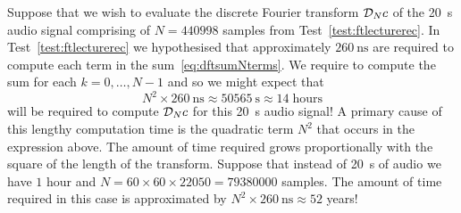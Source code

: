 Suppose that we wish to evaluate the discrete Fourier transform ${\mathcal D}_N c$ of the \SI{20}{\second} audio signal comprising of $N=440998$ samples from Test~\ref{test:ftlecturerec}.  In Test~\ref{test:ftlecturerec} we hypothesised that approximately $\SI{260}{\nano\second}$ are required to compute each term in the sum~\eqref{eq:dftsumNterms}.  We require to compute the sum for each $k = 0,\dots,N-1$ and so we might expect that
\begin{equation}\label{eq:runtimefftformulaapprox}
N^2 \times \SI{260}{\nano\second} \approx \SI{50565}{\second} \approx 14 \; \text{hours}
\end{equation}
will be required to compute ${\mathcal D}_N c$ for this \SI{20}{\second} audio signal!  A primary cause of this lengthy computation time is the quadratic term $N^2$ that occurs in the expression above.  The amount of time required grows proportionally with the square of the length of the transform.  Suppose that instead of \SI{20}{\second} of audio we have $1$ hour and $N = 60 \times 60 \times 22050 = 79380000$ samples.  The amount of time required in this case is approximated by $N^2 \times \SI{260}{\nano\second}  \approx 52$ years!

